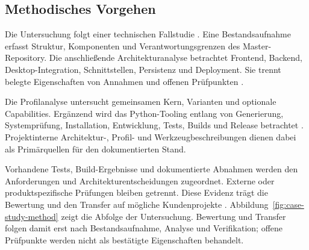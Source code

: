 \subsection{Methodisches Vorgehen}
\label{subsec:methodisches-vorgehen}

Die Untersuchung folgt einer technischen Fallstudie
\parencite{runeson2009case-study}. Eine Bestandsaufnahme erfasst Struktur,
Komponenten und Verantwortungsgrenzen des Master-Repository. Die anschließende
Architekturanalyse betrachtet Frontend, Backend, Desktop-Integration,
Schnittstellen, Persistenz und Deployment. Sie trennt belegte Eigenschaften
von Annahmen und offenen Prüfpunkten \parencite{kleiveist2026architecture}.

Die Profilanalyse untersucht gemeinsamen Kern, Varianten und optionale
Capabilities. Ergänzend wird das Python-Tooling entlang von Generierung,
Systemprüfung, Installation, Entwicklung, Tests, Builds und Release betrachtet
\parencite{kleiveist2026profiles,kleiveist2026tooling}.
Projektinterne Architektur-, Profil- und Werkzeugbeschreibungen dienen dabei
als Primärquellen für den dokumentierten Stand.

Vorhandene Tests, Build-Ergebnisse und dokumentierte Abnahmen werden den
Anforderungen und Architekturentscheidungen zugeordnet. Externe oder
produktspezifische Prüfungen bleiben getrennt. Diese Evidenz trägt die
Bewertung und den Transfer auf mögliche Kundenprojekte
\parencite{kleiveist2026acceptance}. Abbildung~\ref{fig:case-study-method}
zeigt die Abfolge der Untersuchung.
Bewertung und Transfer folgen damit erst nach Bestandsaufnahme, Analyse und
Verifikation; offene Prüfpunkte werden nicht als bestätigte Eigenschaften
behandelt.


